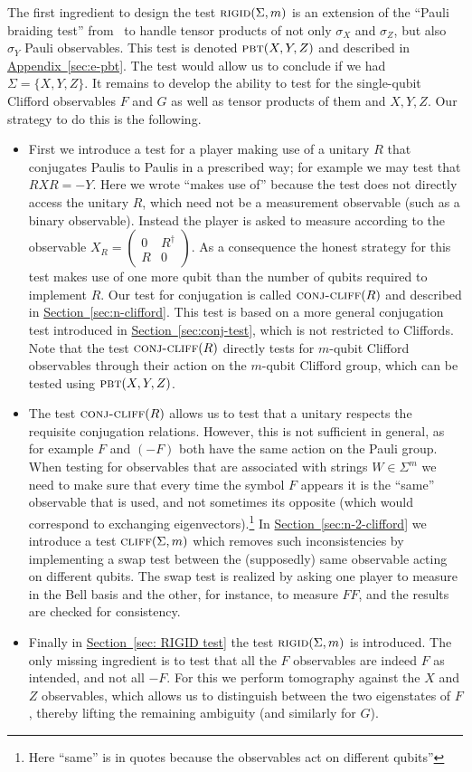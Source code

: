 \documentclass[11pt]{article}
\numberwithin{equation}{section}
\theoremstyle{definition}
\theoremstyle{plain}
\newcommand{\expref}[2]{\hyperref[#2]{#1~\ref{#2}}}
\newcommand{\pbt}{\textsc{pbt}}
\newcommand{\rigid}{\textsc{rigid}}
\newcommand{\conjc}{\textsc{conj-cliff}}
\newcommand{\cliff}{\textsc{cliff}}
\begin{document}
The first ingredient to design the test $\rigid(\Sigma,m)$ is an extension of the ``Pauli braiding test'' from~\cite{natarajan2016robust} to handle tensor products of not only $\sigma_X$ and $\sigma_Z$, but also $\sigma_Y$ Pauli observables. This test is denoted $\pbt(X,Y,Z)$ and described in \expref{Appendix}{sec:e-pbt}. The test would allow us to conclude if we had $\Sigma=\{X,Y,Z\}$. It remains to develop the ability to test for the single-qubit Clifford observables $F$ and $G$ as well as tensor products of them and $X,Y,Z$. Our strategy to do this is the following.
\begin{itemize}
\item First we introduce a test for a player making use of a unitary $R$ that conjugates Paulis to Paulis in a prescribed way; for example we may test that $RXR=-Y$. Here we wrote ``makes use of'' because the test does not directly access the unitary $R$, which need not be a measurement observable (such as a binary observable). Instead the player is asked to measure according to the observable $X_R = \begin{pmatrix} 0 & R^\dagger \\ R & 0 \end{pmatrix}$. As a consequence the honest strategy for this test makes use of one more qubit than the number of qubits required to implement $R$. Our test for conjugation is called $\conjc(R)$ and described in \expref{Section}{sec:n-clifford}. This test is based on a more general conjugation test introduced in \expref{Section}{sec:conj-test}, which is not restricted to Cliffords. Note that the test $\conjc(R)$ directly tests for $m$-qubit Clifford observables through their action on the $m$-qubit Clifford group, which can be tested using $\pbt(X,Y,Z)$. 
\item The test $\conjc(R)$ allows us to test that a unitary respects the requisite conjugation relations. However, this is not sufficient in general, as for example $F$ and $(-F)$ both have the same action on the Pauli group. When testing for observables that are associated with strings $W\in\Sigma^m$ we need to make sure that every time the symbol $F$ appears it is the ``same'' observable that is used, and not sometimes its opposite (which would correspond to exchanging eigenvectors).\footnote{Here %
``same''  %
is in quotes because the observables act on different qubits''} In \expref{Section}{sec:n-2-clifford} we introduce a test $\cliff(\Sigma,m)$ which removes such inconsistencies by implementing a swap test between the (supposedly) same observable acting on different qubits. The swap test is realized by asking one player to measure in the Bell basis and the %
other, for instance, to  %
measure $FF$, and the results are checked for consistency. 
\item Finally in \expref{Section}{sec: RIGID test} the test $\rigid(\Sigma,m)$ is introduced. The only missing ingredient is to test that all the $F$ observables are indeed $F$ as intended, and not all $-F$. For this we perform tomography against the $X$ and $Z$ observables, which allows us to distinguish between the two eigenstates of $F$, thereby lifting the remaining ambiguity (and similarly for $G$).
\end{itemize}
\end{document}

